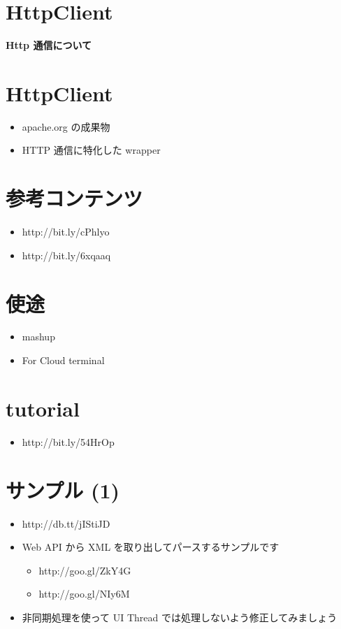 \documentclass[slide,papersize]{jsarticle}
\begin{document}
\section*{HttpClient}
\vspace*{15mm}
\begin{center}
{\Huge {\bf Http 通信について}}
\end{center}

\section*{HttpClient}
\bigskip
\begin{itemize}
\item apache.org の成果物
\bigskip
\item HTTP 通信に特化した wrapper
\end{itemize}

\section*{参考コンテンツ}
\bigskip
\begin{itemize}
\item http://bit.ly/cPhlyo
\bigskip
\item http://bit.ly/6xqaaq
\end{itemize}

\section*{使途}
\bigskip
\begin{itemize}
\item mashup
\bigskip
\item For Cloud terminal
\end{itemize}

\section*{tutorial}
\bigskip
\begin{itemize}
\item http://bit.ly/54HrOp
\end{itemize}

\section*{サンプル (1)}
\medskip
\begin{itemize}
\item http://db.tt/jIStiJD
\medskip
\item Web API から XML を取り出してパースするサンプルです
 \begin{itemize}
 \item http://goo.gl/ZkY4G
 \item http://goo.gl/NIy6M
 \end{itemize}
\medskip
\item 非同期処理を使って UI Thread では処理しないよう修正してみましょう
\end{itemize}
\end{document}
